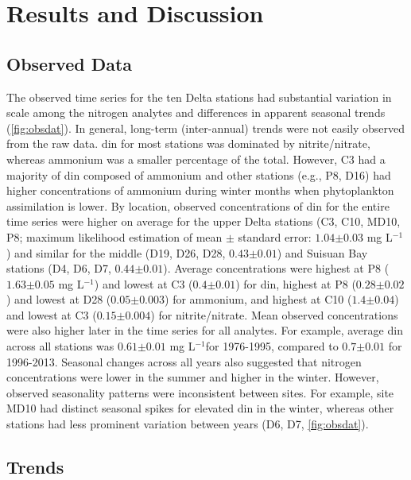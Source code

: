 \documentclass[journal = esthag, manuscript = article]{achemso}\usepackage[]{graphicx}\usepackage[]{color}
\newcommand{\mgl}{mg L$^{-1}$}
\begin{document}
\section{Results and Discussion}

\subsection{Observed Data}



The observed time series for the ten Delta stations had substantial variation in scale among the nitrogen analytes and differences in apparent seasonal trends (\cref{fig:obsdat}).  In general, long-term (inter-annual) trends were not easily observed from the raw data. \ac{din} for most stations was dominated by nitrite/nitrate, whereas ammonium was a smaller percentage of the total.  However, C3 had a majority of \ac{din} composed of ammonium and other stations (e.g., P8, D16) had higher concentrations of ammonium during winter months when phytoplankton assimilation is lower\cite{Novick15}.  By location, observed concentrations of \ac{din} for the entire time series were higher on average for the upper Delta stations (C3, C10, MD10, P8; maximum likelihood estimation of mean $\pm$ standard error: $1.04$$\pm$$0.03$ \mgl) and similar for the middle (D19, D26, D28, $0.43$$\pm$$0.01$) and Suisuan Bay stations (D4, D6, D7, $0.44$$\pm$$0.01$).  Average concentrations were highest at P8 ($1.63$$\pm$$0.05$ \mgl) and lowest at C3 ($0.4$$\pm$$0.01$) for \ac{din}, highest at P8 ($0.28$$\pm$$0.02$) and lowest at D28 ($0.05$$\pm$$0.003$) for ammonium, and highest at C10 ($1.4$$\pm$$0.04$) and lowest at C3 ($0.15$$\pm$$0.004$) for nitrite/nitrate. Mean observed concentrations were also higher later in the time series for all analytes.  For example, average \ac{din} across all stations was $0.61$$\pm$$0.01$ \mgl for 1976-1995, compared to $0.7$$\pm$$0.01$ for 1996-2013. Seasonal changes across all years also suggested that nitrogen concentrations were lower in the summer and higher in the winter.  However, observed seasonality patterns were inconsistent between sites.  For example, site MD10 had distinct seasonal spikes for elevated \ac{din} in the winter, whereas other stations had less prominent variation between years (D6, D7, \cref{fig:obsdat}).  

\subsection{Trends}
\end{document}
